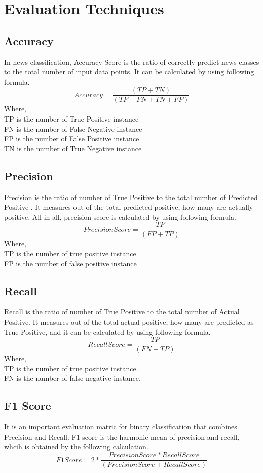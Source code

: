 \section{Evaluation Techniques}
\subsection{Accuracy}
In news classification, Accuracy Score is the ratio of correctly predict news classes to the total number of input data points. It can be calculated by using following formula. \
\[ 
 Accuracy=\frac{(TP+TN)}{(TP+FN+TN+FP)} 
\]
Where, \\
TP is the number of True Positive instance\\
FN is the number of False Negative instance\\
FP is the number of False Positive instance\\
TN is the number of True Negative instance
\subsection{Precision}
Precision is the ratio of number of True Positive to the total number of Predicted Positive . It measures out of the total predicted positive, how many are actually positive. All in all, precision score is calculated by using following formula.\
\[ 
 Precision Score=\frac{TP}{(FP+TP)} 
\]
Where,\\
TP is the number of true positive instance\\
FP is the number of false positive instance
\subsection{Recall}
Recall is the ratio of number of True Positive to the total number of Actual Positive. It measures out of the total actual positive, how many are predicted as True Positive, and it can be calculated by using following formula.\
\[ 
 Recall Score=\frac{TP}{(FN+TP)} 
\]
Where,\\
TP is the number of true positive instance.\\
FN is the number of false-negative instance.
\subsection{F1 Score}
It is an important evaluation matric for binary classification that combines Precision and Recall. F1 score is the harmonic mean of precision and recall, whcih is obtained by the following calculation.\
\[ 
 F1 Score=2*\frac{Precision Score*Recall Score}{(Precision Score+Recall Score)} 
\]